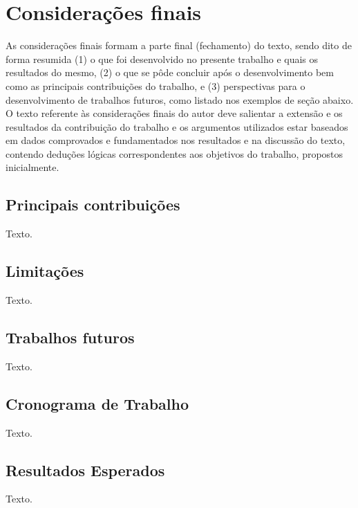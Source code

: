 \chapter{Considerações finais}
\label{cap:capitulo6}

As considerações finais formam a parte final (fechamento) do texto, sendo dito de forma resumida (1) o que foi desenvolvido no presente trabalho e quais os resultados do mesmo, (2) o que se pôde concluir após o desenvolvimento bem como as principais contribuições do trabalho, e (3) perspectivas para o desenvolvimento de trabalhos futuros, como listado nos exemplos de seção abaixo. O texto referente às considerações finais do autor deve salientar a extensão e os resultados da contribuição do trabalho e os argumentos utilizados estar baseados em dados comprovados e fundamentados nos resultados e na discussão do texto, contendo deduções lógicas correspondentes aos objetivos do trabalho, propostos inicialmente.


\section{Principais contribuições}
Texto.


\section{Limitações}
Texto.


\section{Trabalhos futuros}
Texto.

\section{Cronograma de Trabalho}
Texto.


\section{Resultados Esperados}
Texto.
